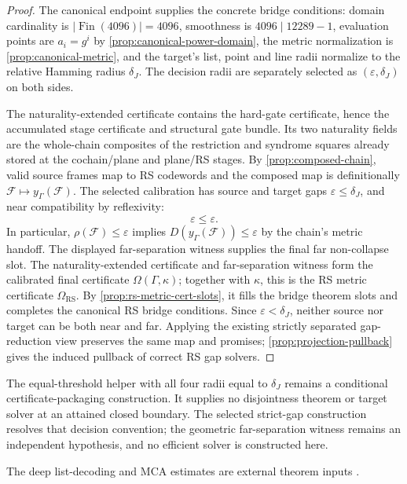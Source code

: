 \begin{proof}
The canonical endpoint supplies the concrete bridge conditions:
domain cardinality is \(|\operatorname{Fin}(4096)|=4096\), smoothness is
\(4096\mid12289-1\), evaluation points are \(a_i=g^i\) by
\cref{prop:canonical-power-domain}, the metric normalization is
\cref{prop:canonical-metric}, and the target's list, point and line radii
normalize to the relative Hamming radius \(\delta_J\). The decision radii
are separately selected as \((\varepsilon,\delta_J)\) on both sides.

The naturality-extended certificate contains the hard-gate certificate, hence
the accumulated stage certificate and structural gate bundle. Its two
naturality fields are the whole-chain composites of the restriction and
syndrome squares already stored at the cochain/plane and plane/RS stages. By
\cref{prop:composed-chain}, valid source frames
map to RS codewords and the composed map is definitionally
\(\mathcal F\mapsto y_\Gamma(\mathcal F)\). The selected calibration has
source and target gaps \(\varepsilon\le\delta_J\), and near compatibility
by reflexivity:
\[
  \varepsilon\le\varepsilon.
\]
In particular, \(\rho(\mathcal F)\le\varepsilon\) implies
\(D(y_\Gamma(\mathcal F))\le\varepsilon\) by the chain's metric handoff.
The displayed far-separation witness supplies the final far non-collapse slot.
The naturality-extended certificate and far-separation witness form the
calibrated final certificate \(\Omega(\Gamma,\kappa)\); together with
\(\kappa\), this is the RS metric certificate \(\Omega_{\mathrm{RS}}\). By
\cref{prop:rs-metric-cert-slots}, it fills the bridge theorem slots and
completes the canonical RS bridge conditions. Since
\(\varepsilon<\delta_J\), neither source nor target can be both near and
far. Applying the existing strictly separated gap-reduction view preserves
the same map and promises; \cref{prop:projection-pullback} gives the induced
pullback of correct RS gap solvers.
\end{proof}

The equal-threshold helper with all four radii equal to \(\delta_J\)
remains a conditional certificate-packaging construction. It supplies no
disjointness theorem or target solver at an attained closed boundary.
The selected strict-gap construction resolves that decision convention;
the geometric far-separation witness remains an independent hypothesis,
and no efficient solver is constructed here.

The deep list-decoding and MCA estimates are external theorem inputs
\cite{benSassonCarmonHabockKoppartySaraf2026,proximityPrize2026}.

